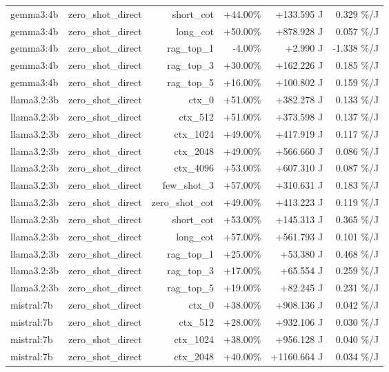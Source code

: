 \begin{table}[t]
\begin{tabular}{lrrrrr}
gemma3:4b & zero\_shot\_direct & short\_cot & +44.00\% & +133.595 J & 0.329 \%/J \\
gemma3:4b & zero\_shot\_direct & long\_cot & +50.00\% & +878.928 J & 0.057 \%/J \\
gemma3:4b & zero\_shot\_direct & rag\_top\_1 & -4.00\% & +2.990 J & -1.338 \%/J \\
gemma3:4b & zero\_shot\_direct & rag\_top\_3 & +30.00\% & +162.226 J & 0.185 \%/J \\
gemma3:4b & zero\_shot\_direct & rag\_top\_5 & +16.00\% & +100.802 J & 0.159 \%/J \\
llama3.2:3b & zero\_shot\_direct & ctx\_0 & +51.00\% & +382.278 J & 0.133 \%/J \\
llama3.2:3b & zero\_shot\_direct & ctx\_512 & +51.00\% & +373.598 J & 0.137 \%/J \\
llama3.2:3b & zero\_shot\_direct & ctx\_1024 & +49.00\% & +417.919 J & 0.117 \%/J \\
llama3.2:3b & zero\_shot\_direct & ctx\_2048 & +49.00\% & +566.660 J & 0.086 \%/J \\
llama3.2:3b & zero\_shot\_direct & ctx\_4096 & +53.00\% & +607.310 J & 0.087 \%/J \\
llama3.2:3b & zero\_shot\_direct & few\_shot\_3 & +57.00\% & +310.631 J & 0.183 \%/J \\
llama3.2:3b & zero\_shot\_direct & zero\_shot\_cot & +49.00\% & +413.223 J & 0.119 \%/J \\
llama3.2:3b & zero\_shot\_direct & short\_cot & +53.00\% & +145.313 J & 0.365 \%/J \\
llama3.2:3b & zero\_shot\_direct & long\_cot & +57.00\% & +561.793 J & 0.101 \%/J \\
llama3.2:3b & zero\_shot\_direct & rag\_top\_1 & +25.00\% & +53.380 J & 0.468 \%/J \\
llama3.2:3b & zero\_shot\_direct & rag\_top\_3 & +17.00\% & +65.554 J & 0.259 \%/J \\
llama3.2:3b & zero\_shot\_direct & rag\_top\_5 & +19.00\% & +82.245 J & 0.231 \%/J \\
mistral:7b & zero\_shot\_direct & ctx\_0 & +38.00\% & +908.136 J & 0.042 \%/J \\
mistral:7b & zero\_shot\_direct & ctx\_512 & +28.00\% & +932.106 J & 0.030 \%/J \\
mistral:7b & zero\_shot\_direct & ctx\_1024 & +38.00\% & +956.128 J & 0.040 \%/J \\
mistral:7b & zero\_shot\_direct & ctx\_2048 & +40.00\% & +1160.664 J & 0.034 \%/J \\

\end{tabular}
\end{table}
